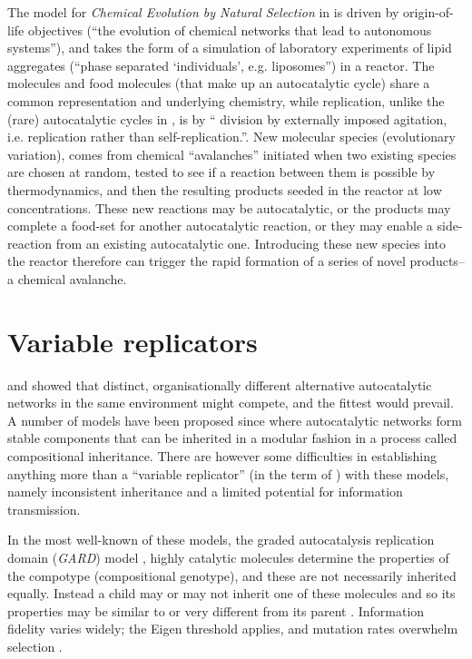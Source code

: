 The model for \emph{Chemical Evolution by Natural Selection} in \textcite{Fernando:2008xy,Fernando:2007pf} is driven by origin-of-life objectives (``the evolution of chemical networks that lead to autonomous systems''), and takes the form of a simulation of laboratory experiments of lipid aggregates (``phase separated ‘individuals’, e.g. liposomes'') in a reactor. The molecules and food molecules (that make up an autocatalytic cycle) share a common representation and underlying chemistry, while replication, unlike the (rare) autocatalytic cycles in \textcite{Faulconbridge2011}, is by `` division by externally imposed agitation, i.e. replication rather than self-replication.''. New molecular species (evolutionary variation), comes from chemical ``avalanches'' initiated when two existing species are chosen at random, tested to see if a reaction between them is possible by thermodynamics, and then the resulting products seeded in the reactor at low concentrations. These new reactions may be autocatalytic, or the products may complete a food-set for another autocatalytic reaction, or they may enable a side-reaction from an existing autocatalytic one. Introducing these new species into the reactor therefore can trigger the rapid formation of a series of novel products--a chemical avalanche.

\section{Variable replicators}\label{variable-replicators}
\Textcite{Ganti:2003hl} and  \textcite{Eigen1971} showed that distinct, organisationally different alternative autocatalytic networks in the same environment might compete, and the fittest would prevail. A number of models have been proposed since where autocatalytic networks form stable components that can be inherited in a modular fashion in a process called compositional inheritance. There are however some difficulties in establishing anything more than a ``variable replicator'' (in the term of \textcite{Zachar2010}) with these models, namely inconsistent inheritance and a limited potential for information transmission.


In the most well-known of these models, the graded autocatalysis replication domain (\emph{GARD}) model \parencite{Segre1998}, highly catalytic molecules determine the properties of the compotype (compositional genotype), and these are not necessarily inherited equally. Instead a child may or may not inherit one of these molecules and so its properties may be similar to or very different from its parent \parencite{Vasas2015, Vasas2012, Vasas2012a}. Information fidelity varies widely; the Eigen threshold \parencite{Eigen1971} applies, and mutation rates overwhelm selection \parencite{Vasas2015, Vasas2012, Vasas2012a}.

